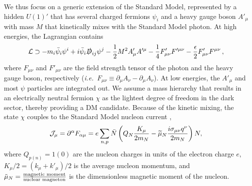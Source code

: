 \documentclass[11pt]{article}
\newcommand{\ie}{{\it i.e.~}}  \newcommand{\eg}{{\it e.g.~}}
\newcommand{\pL}{\left(} \newcommand{\pR}{\right)} \newcommand{\bL}{\left[} \newcommand{\bR}{\right]} \newcommand{\cbL}{\left\{} \newcommand{\cbR}{\right\}} \newcommand{\mL}{\left|} \newcommand{\mR}{\right|} \newcommand{\ER}{E_R}
\newcommand{\beq}{\begin{equation}} \newcommand{\eeq}{\end{equation}}
\begin{document}
We thus focus on a generic extension of the Standard Model, represented by a hidden $U(1)'$ that has several charged fermions $\psi_i$ and a heavy gauge boson $A'_\mu$ with mass $M$ that kinetically mixes with the Standard Model photon. At high energies, the Lagrangian contains
\beq \label{eq:UV-model}
\cL \supset -  m_i \bar{\psi}_i \psi^i + i \bar \psi_i \slashed D_{ij} \psi^j  - \frac12 M^2 A'_\mu A'^\mu  - \frac14 F'_{\mu \nu} F'^{\mu \nu} - \frac\epsilon2 F'_{\mu \nu} F^{\mu \nu} \, ,
\eeq
where $F_{\mu \nu}$ and $F'_{\mu \nu}$ are the field strength tensor of the photon and the heavy gauge boson, respectively (\ie $F_{\mu \nu} \equiv \partial_\mu A_\nu - \partial_\mu A_\nu$). At low energies, the $A'_\mu$ and most $\psi$ particles are integrated out. We assume a mass hierarchy that results in an electrically neutral fermion $\chi$ as the lightest degree of freedom in the dark sector, thereby providing a DM candidate. Because of the kinetic mixing, the state $\chi$ couples to the Standard Model nucleon current \cite{Gresham:2014vja},
\beq \label{eq:current}
\cJ_\mu = \partial^\alpha F_{\alpha \mu} = e \sum_{n,p} \bar N \pL Q_N \frac{K_\mu}{2m_N} -\widetilde \mu_N \frac{i \sigma_{\mu \nu}q^\nu}{2m_N} \pR N,
\eeq 
where $Q_{p(n)}=1(0)$ are the nucleon charges in units of the electron charge $e$, $K_\mu/2 = (k_\mu + k'_\mu)/2$ is the average nucleon momentum, and $\tilde{\mu}_N = {\text{magnetic moment} \over \text{nuclear magneton}}$ is the dimensionless magnetic moment of the nucleon.
\end{document}
